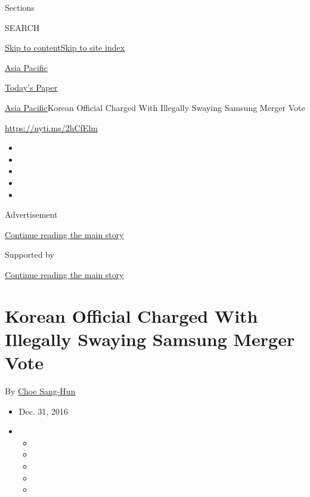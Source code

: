 Sections

SEARCH

\protect\hyperlink{site-content}{Skip to
content}\protect\hyperlink{site-index}{Skip to site index}

\href{https://www.nytimes3xbfgragh.onion/section/world/asia}{Asia
Pacific}

\href{https://myaccount.nytimes3xbfgragh.onion/auth/login?response_type=cookie\&client_id=vi}{}

\href{https://www.nytimes3xbfgragh.onion/section/todayspaper}{Today's
Paper}

\href{/section/world/asia}{Asia Pacific}\textbar{}Korean Official
Charged With Illegally Swaying Samsung Merger Vote

\url{https://nyti.ms/2hCfElm}

\begin{itemize}
\item
\item
\item
\item
\item
\end{itemize}

Advertisement

\protect\hyperlink{after-top}{Continue reading the main story}

Supported by

\protect\hyperlink{after-sponsor}{Continue reading the main story}

\hypertarget{korean-official-charged-with-illegally-swaying-samsung-merger-vote}{%
\section{Korean Official Charged With Illegally Swaying Samsung Merger
Vote}\label{korean-official-charged-with-illegally-swaying-samsung-merger-vote}}

By \href{http://www.nytimes3xbfgragh.onion/by/choe-sang-hun}{Choe
Sang-Hun}

\begin{itemize}
\item
  Dec. 31, 2016
\item
  \begin{itemize}
  \item
  \item
  \item
  \item
  \item
  \end{itemize}
\end{itemize}

